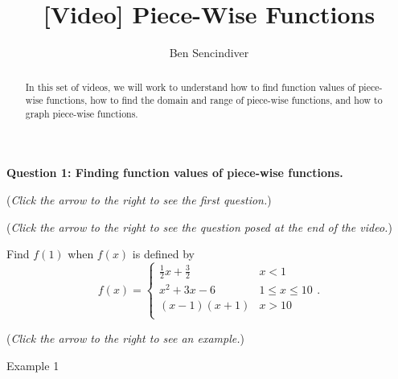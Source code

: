 \documentclass{ximera}
\title[Prerequisite Videos: ]{[Video] Piece-Wise Functions}
\author{Ben Sencindiver}
\begin{document}
\begin{abstract}
   In this set of videos, we will work to understand how to find function values of piece-wise functions, how to find the domain and range of piece-wise functions, and how to graph piece-wise functions.
\end{abstract}
\maketitle

\textbf{Question 1: Finding function values of piece-wise functions.}
\begin{question}
\begin{flushright}
{\color{blue}(\emph{Click the arrow to the right to see the first question.})}
\end{flushright}
\begin{center}
\begin{expandable}
\begin{flushright}
{\color{blue}(\emph{Click the arrow to the right to see the question
posed at the end of the video.})}
\end{flushright}
\begin{expandable}
Find $f(1)$ when $f(x)$ is defined by
\[ f(x) = \begin{cases} 
      \frac{1}{2}x + \frac{3}{2} & x<1 \\
     x^2+3x - 6 & 1\leq x\leq 10 \\
      (x-1)(x+1) & x>10\\	
   \end{cases}. \]
\begin{multipleChoice}
\end{multipleChoice}
\begin{flushright}
{\color{blue}(\emph{Click the arrow to the right to see an example.})}
\end{flushright}
\begin{expandable}
\begin{center}
Example 1
\end{center}
\end{expandable}
\end{expandable}
\end{expandable}
\end{center}
\end{question}
\end{document}

